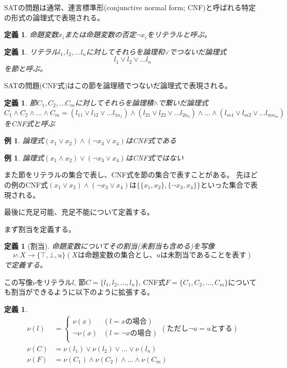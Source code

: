 \documentclass[titlepage]{jsarticle}
\newtheorem{definition}[thm]{定義}
\newtheorem{example}[thm]{例}
\begin{document}
SATの問題は通常、連言標準形(conjunctive normal form; CNF)と呼ばれる特定の形式の論理式で表現される。

\begin{definition}
	命題変数$x_i$または命題変数の否定$\neg x_i$をリテラルと呼ぶ。
\end{definition}

\begin{definition}
リテラル$l_1, l_2, ...l_n$に対してそれらを論理和$\lor$でつないだ論理式
\[
	l_1 \lor l_2 \lor ... l_n
\]
を節と呼ぶ。
\end{definition}

SATの問題(CNF式)はこの節を論理積でつないだ論理式で表現される。

\begin{definition}
	節$C_1, C_2, ...C_m$に対してそれらを論理積$\land$で繋いだ論理式
	\[
		C_1 \land C_2 \land ... \land C_m = (l_{11} \lor l_{12} \lor ... l_{1n_1}) \land (l_{21} \lor l_{22} \lor ... l_{2n_2}) \land ... \land (l_{m1} \lor l_{m2} \lor ... l_{mn_m})
	\]
	をCNF式と呼ぶ
\end{definition}

\begin{example}
	論理式$(x_1 \lor x_2) \land (\neg x_3 \lor x_4)$はCNF式である
\end{example}

\begin{example}
	論理式$(x_1 \land x_2) \lor (\neg x_3 \lor x_4)$はCNF式ではない
\end{example}

また節をリテラルの集合で表し、CNF式を節の集合で表すことがある。
先ほどの例のCNF式$(x_1 \lor x_2) \land (\neg x_3 \lor x_4)$は$\{\{x_1, x_2\}, \{\neg x_3, x_4\}\}$といった集合で表現される。

最後に充足可能、充足不能について定義する。

まず割当を定義する。
\begin{definition}[割当]
命題変数についてその割当(未割当も含める)を写像
	\[
		\nu: X \to \{\top, \bot, u\} (X{は命題変数の集合とし、}u{は未割当であることを表す})
	\]
で定義する。
\end{definition}

この写像$\nu$をリテラル$l$, 節$C=\{l_1, l_2, ..., l_n\}$, CNF式$F=\{C_1, C_2, ..., C_m\}$についても割当ができるように以下のように拡張する。
\begin{definition}
	\begin{align*}
		\nu(l) & = 
		\begin{cases}
			\nu(x)     & (l= x{の場合}) \\
			\neg\nu(x) & (l=\neg x{の場合}) \\
		\end{cases}
		({ただし}\neg u = u{とする}) \\
		\nu(C) & = \nu(l_1) \lor  \nu(l_2) \lor  ... \lor  \nu(l_n) \\
		\nu(F) & = \nu(C_1) \land \nu(C_2) \land ... \land \nu(C_m)
	\end{align*}
\end{definition}
\end{document}
